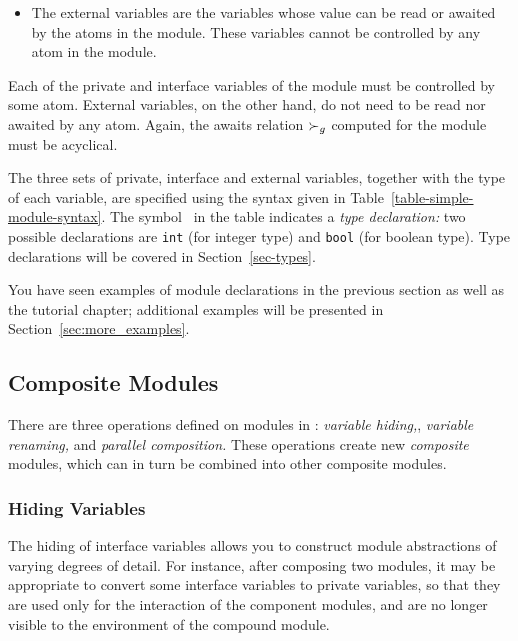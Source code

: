 {\begin{itemize}
\item The external variables  are the
variables whose value can be read or awaited by the atoms in the
module.  These variables cannot be controlled by any atom in the
module.

\end{itemize}
%
Each of the private and interface variables of the module must be
controlled by some atom.  External variables, on the other hand, do
not need to be read nor awaited by any atom.  Again, the awaits
relation $\succ_g$ computed for the module
must be acyclical.

The three sets of private, interface and external variables, together
with the type of each variable, are specified using the syntax given
in Table~\ref{table-simple-module-syntax}.  The symbol \typeid\ in the table
indicates a {\em type declaration:\/} two
possible declarations are {\tt int} (for integer type) and {\tt bool}
(for boolean type).  Type declarations will be covered in
Section~\ref{sec-types}.

You have seen examples of module declarations in the previous section
as well as the tutorial chapter;
additional examples will be presented in Section~\ref{sec:more_examples}. 



\subsection{Composite Modules}

There are three operations defined on modules in \mocha: {\em variable
hiding,}, {\em variable
renaming,} and {\em parallel
composition.} 
These operations create new {\em composite\/} modules, which can in
turn be combined into other composite modules. 


\subsubsection{Hiding Variables}  

The hiding of interface variables allows you to construct module
abstractions of varying degrees of detail.  For instance, after
composing two modules, it may be appropriate to convert some interface
variables to private variables, so that they are used only for the
interaction of the component modules, and are no longer visible to the
environment of the compound module.

}
